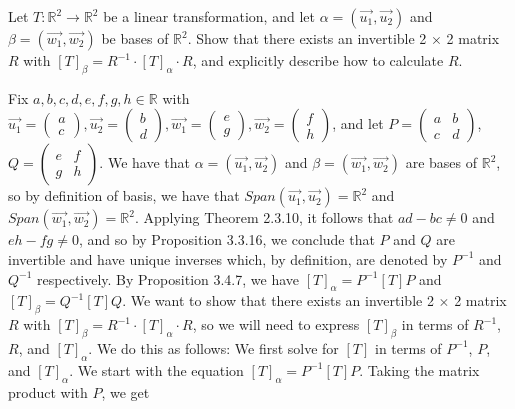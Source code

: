 \documentclass[12pt]{article}
\newenvironment{problem}[2][Problem]
{
	\begin{trivlist} 
		\item[\hskip \labelsep {\bfseries #1 #2:}]
	}
{
	\end{trivlist}
	}
\newenvironment{solution}[1][Solution]
{
	\begin{trivlist} 
		\item[\hskip \labelsep {\itshape #1:}]
	}
	{
	\end{trivlist}
}
\begin{document}
\newpage
\begin{problem}{2}
Let $T:\mathbb{R}^2 \to \mathbb{R}^2$ be a linear transformation, and let  $\alpha=(\vec{u_{1}},\vec{u_{2}})$ and  $\beta=(\vec{w_{1}},\vec{w_{2}})$ be bases of $\mathbb{R}^2$. Show that there exists an invertible 2 $\times$ 2 matrix $R$ with $[T]_{\beta}=R^{-1} \cdot [T]_{\alpha} \cdot R$, and explicitly describe how to calculate $R$.
\noindent
\newline
\newline
\begin{solution}
Fix $a,b,c,d, e,f,g,h \in \mathbb{R}$ with $\vec{u_{1}} = \begin{pmatrix} a\\c\end{pmatrix}, \vec{u_{2}} = \begin{pmatrix} b\\d\end{pmatrix}, \vec{w_{1}} = \begin{pmatrix} e\\g\end{pmatrix}, \vec{w_{2}} = \begin{pmatrix} f\\h\end{pmatrix}$, and let $P=\begin{pmatrix} a & b\\ c& d \end{pmatrix}$, $Q=\begin{pmatrix} e & f\\ g& h \end{pmatrix}$. We have that $\alpha=(\vec{u_{1}},\vec{u_{2}})$ and  $\beta=(\vec{w_{1}},\vec{w_{2}})$ are bases of $\mathbb{R}^2$, so by definition of basis, we have that $Span(\vec{u_{1}},\vec{u_{2}})=\mathbb{R}^2$ and $Span(\vec{w_{1}},\vec{w_{2}})=\mathbb{R}^2$. Applying Theorem 2.3.10, it follows that $ad-bc \neq 0$ and $eh-fg \neq 0$, and so by Proposition 3.3.16, we conclude that $P$ and $Q$ are invertible and have unique inverses which, by definition, are denoted by $P^{-1}$ and $Q^{-1}$ respectively. By Proposition 3.4.7, we have $[T]_{\alpha} = P^{-1} [T] P$ and $[T]_{\beta} = Q^{-1} [T] Q$. We want to show that there exists an invertible 2 $\times$ 2 matrix $R$ with $[T]_{\beta}=R^{-1} \cdot [T]_{\alpha} \cdot R$, so we will need to express $[T]_{\beta}$ in terms of $R^{-1}$, $R$, and $[T]_{\alpha}$. We do this as follows: We first solve for $[T]$ in terms of $P^{-1}$, $P$, and $[T]_{\alpha}$. We start with the equation $[T]_{\alpha} = P^{-1} [T] P$. Taking the matrix product with $P$, we get

\end{solution}
\end{problem}
\end{document}
